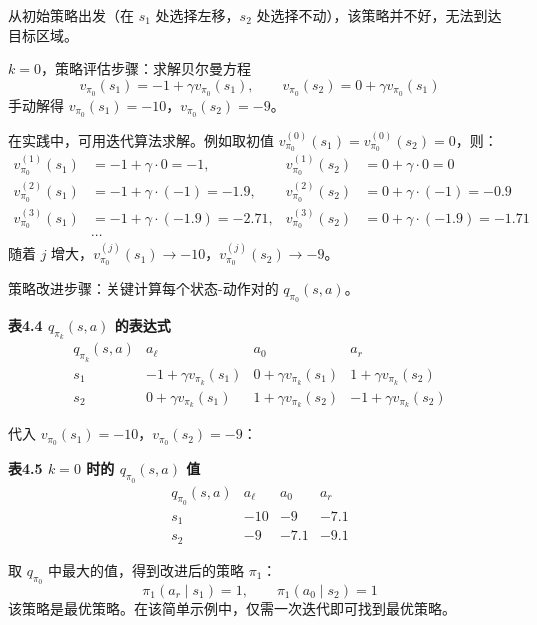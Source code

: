 \documentclass[UTF8]{article}
\begin{document}
从初始策略出发（在 $s_1$ 处选择左移，$s_2$ 处选择不动），该策略并不好，无法到达目标区域。

\textbf{$k = 0$}，策略评估步骤：求解贝尔曼方程
\[
v_{\pi_0}(s_1) = -1 + \gamma v_{\pi_0}(s_1), \qquad v_{\pi_0}(s_2) = 0 + \gamma v_{\pi_0}(s_1)
\]
手动解得 $v_{\pi_0}(s_1) = -10$，$v_{\pi_0}(s_2) = -9$。

在实践中，可用迭代算法求解。例如取初值 $v_{\pi_0}^{(0)}(s_1) = v_{\pi_0}^{(0)}(s_2) = 0$，则：
\[
\begin{aligned}
v_{\pi_0}^{(1)}(s_1) &= -1 + \gamma \cdot 0 = -1, & v_{\pi_0}^{(1)}(s_2) &= 0 + \gamma \cdot 0 = 0 \\
v_{\pi_0}^{(2)}(s_1) &= -1 + \gamma \cdot (-1) = -1.9, & v_{\pi_0}^{(2)}(s_2) &= 0 + \gamma \cdot (-1) = -0.9 \\
v_{\pi_0}^{(3)}(s_1) &= -1 + \gamma \cdot (-1.9) = -2.71, & v_{\pi_0}^{(3)}(s_2) &= 0 + \gamma \cdot (-1.9) = -1.71 \\
&\cdots
\end{aligned}
\]
随着 $j$ 增大，$v_{\pi_0}^{(j)}(s_1) \to -10$，$v_{\pi_0}^{(j)}(s_2) \to -9$。

策略改进步骤：关键计算每个状态-动作对的 $q_{\pi_0}(s,a)$。

\begin{center}
\textbf{表4.4 $q_{\pi_k}(s,a)$ 的表达式}
\[
\begin{array}{c|ccc}
q_{\pi_k}(s,a) & a_\ell & a_0 & a_r \\
\hline
s_1 & -1 + \gamma v_{\pi_k}(s_1) & 0 + \gamma v_{\pi_k}(s_1) & 1 + \gamma v_{\pi_k}(s_2) \\
s_2 & 0 + \gamma v_{\pi_k}(s_1) & 1 + \gamma v_{\pi_k}(s_2) & -1 + \gamma v_{\pi_k}(s_2)
\end{array}
\]
\end{center}

代入 $v_{\pi_0}(s_1) = -10$，$v_{\pi_0}(s_2) = -9$：

\begin{center}
\textbf{表4.5 $k=0$ 时的 $q_{\pi_0}(s,a)$ 值}
\[
\begin{array}{c|ccc}
q_{\pi_0}(s,a) & a_\ell & a_0 & a_r \\
\hline
s_1 & -10 & -9 & -7.1 \\
s_2 & -9 & -7.1 & -9.1
\end{array}
\]
\end{center}

取 $q_{\pi_0}$ 中最大的值，得到改进后的策略 $\pi_1$：
\[
\pi_1(a_r \mid s_1) = 1, \qquad \pi_1(a_0 \mid s_2) = 1
\]
该策略是最优策略。在该简单示例中，仅需一次迭代即可找到最优策略。
\end{document}
